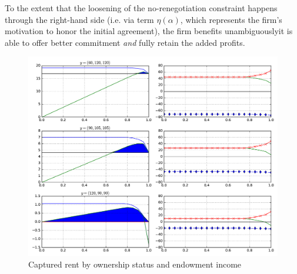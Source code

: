 \documentclass[11pt,english]{article}
\theoremstyle{plain}
\theoremstyle{definition}
\begin{document}
To the extent that the loosening of the no-renegotiation constraint
happens through the right-hand side (i.e. via term $\eta\left(\alpha\right)$,
which represents the firm's motivation to honor the initial agreement),
the firm benefits unambiguously\textendash it is able to offer better
commitment \emph{and} fully retain the added profits.

\begin{figure}
  \includegraphics[width=1\textwidth]{fig_nonprofits.pdf}
  \caption{\label{fig:nonprofit}Captured rent by ownership status and endowment
income}

\end{figure}
\end{document}
